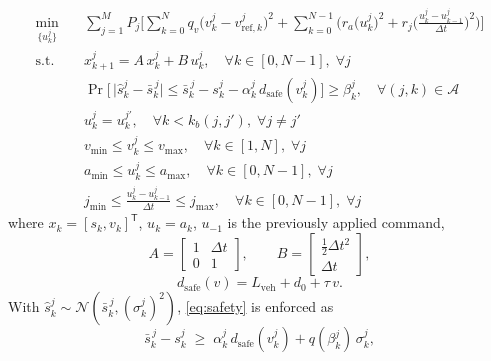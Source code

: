 \documentclass[letterpaper, 10 pt, journal]{IEEEtran}
\begin{document}
\begin{subequations} \label{eq:mpc_problem}
\begin{align}
    \min_{\{u^j_k\}} \quad
    & \sum_{j=1}^{M} P_j
      \Bigg[
        \sum_{k=0}^{N} q_v \big(v^j_k - v^j_{\mathrm{ref},k}\big)^2
        + \sum_{k=0}^{N-1} \bigg(
            r_a \big(u^j_k\big)^2
            + r_j \bigg(\frac{u^j_k - u^j_{k-1}}{\Delta t}\bigg)^2
          \bigg)
      \Bigg]
      \label{eq:cost} \\
    \textrm{s.t.} \quad
    & x^j_{k+1} = A\,x^j_k + B\,u^j_k,
      \quad \forall k \in [0, N-1],\; \forall j
      \label{eq:dynamics} \\
    & \Pr\!\Big[\,\big|\hat s^j_k - \bar s^{\,j}_k\big|
      \le \bar s^{\,j}_k - s^j_k - \alpha^j_k\, d_{\mathrm{safe}}(v^j_k)\Big] \ge \beta^j_k,
      \quad \forall (j,k) \in \mathcal{A}
      \label{eq:safety} \\
    & u^j_k = u^{j'}_k,
      \quad \forall k < k_b(j,j'), \;
      \forall j \neq j'
      \label{eq:branch_nac} \\
    & v_{\min} \le v^j_k \le v_{\max},
      \quad \forall k \in [1, N], \; \forall j
      \label{eq:state_bound} \\
    & a_{\min} \le u^j_k \le a_{\max},
      \quad \forall k \in [0, N-1], \; \forall j
      \label{eq:input_bound} \\
    & j_{\min} \le \frac{u^j_k - u^j_{k-1}}{\Delta t} \le j_{\max},
      \quad \forall k \in [0, N-1], \; \forall j
      \label{eq:jerk_bound}
\end{align}
\end{subequations}
where $x_k = [s_k, v_k]^\mathsf{T}$, $u_k = a_k$, $u_{-1}$ is the previously applied command,
\begin{equation}
    A = \begin{bmatrix} 1 & \Delta t \\ 0 & 1 \end{bmatrix}, \qquad
    B = \begin{bmatrix} \tfrac{1}{2}\Delta t^2 \\ \Delta t \end{bmatrix},
    \label{eq:ab}
\end{equation}
\begin{equation}
    d_{\mathrm{safe}}(v) = L_{\mathrm{veh}} + d_0 + \tau\, v .
    \label{eq:dsafe}
\end{equation}
With $\hat s^j_k \sim \mathcal{N}(\bar s^{\,j}_k, (\sigma^j_k)^2)$, \eqref{eq:safety} is enforced as
\begin{equation}
    \bar s^{\,j}_k - s^j_k \;\ge\; \alpha^j_k\, d_{\mathrm{safe}}(v^j_k) + q(\beta^j_k)\,\sigma^j_k,
    \label{eq:safety_det}
\end{equation}
\end{document}
